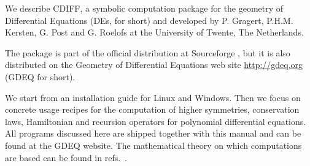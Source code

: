 



\let\DeclareMathOperator\newcommand

\newcommand{\cprime}{\/{\mathsurround=0pt$'$}}

\newcommand*{\pd}[2]{\mathchoice{\frac{\partial#1}{\partial#2}}
  {\partial#1/\partial#2}{\partial#1/\partial#2}
  {\partial#1/\partial#2}}


\newcommand{\cdiff}{CDIFF\xspace}





  We describe \cdiff, a symbolic computation package for
  the geometry of Differential Equations (DEs, for short) and
  developed by P. Gragert, P.H.M. Kersten, G. Post and G. Roelofs at the
  University of Twente, The Netherlands.

  The package is part of the official \REDUCE distribution at Sourceforge
  \cite{red}, but it is also distributed on the Geometry of Differential
  Equations web site \url{http://gdeq.org} (GDEQ for short).

  We start from an installation guide for Linux and Windows. Then we focus on
  concrete usage recipes for the computation of higher symmetries, conservation
  laws, Hamiltonian and recursion operators for polynomial differential
  equations. All programs discussed here are shipped together with this manual
  and can be found at the GDEQ website. The mathematical theory on which
  computations are based can be found in refs.~\cite{Many,KKV}.


